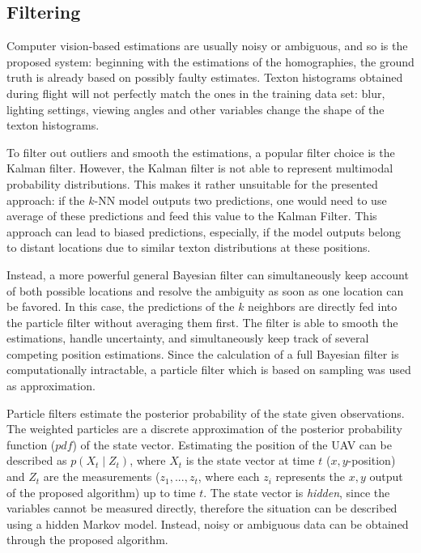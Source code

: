 \documentclass{report}
\begin{document}
\subsection{Filtering}
\label{sec:filtering}

Computer vision-based estimations are usually noisy or ambiguous, and
so is the proposed system: beginning with the estimations of the
homographies, the ground truth is already based on possibly faulty
estimates. Texton histograms obtained during flight will not perfectly
match the ones in the training data set: blur, lighting settings,
viewing angles and other variables change the shape of the texton
histograms.

To filter out outliers and smooth the estimations, a popular filter
choice is the Kalman filter. However, the Kalman filter is not able to
represent multimodal probability distributions. This makes it rather
unsuitable for the presented approach: if the $k$-NN model outputs two
predictions, one would need to use average of these predictions and
feed this value to the Kalman Filter. This approach can lead to biased
predictions, especially, if the model outputs belong to distant
locations due to similar texton distributions at these positions.

Instead, a more powerful general Bayesian filter can simultaneously
keep account of both possible locations and resolve the ambiguity as
soon as one location can be favored. In this case, the predictions of
the $k$ neighbors are directly fed into the particle filter without
averaging them first. The filter is able to smooth the estimations,
handle uncertainty, and simultaneously keep track of several competing
position estimations. Since the calculation of a full Bayesian filter
is computationally intractable, a particle filter which is based on
sampling was used as approximation.

Particle filters estimate the posterior probability of the state given
observations. The weighted particles are a discrete approximation of
the posterior probability function ($pdf$) of the state vector.
Estimating the position of the UAV can be described as
$p(X_t \mid Z_t)$, where $X_t$ is the state vector at time $t$
($x,y$-position) and $Z_t$ are the measurements ($z_1, ..., z_t$,
where each $z_i$ represents the $x,y$ output of the proposed
algorithm) up to time $t$. The state vector is \emph{hidden}, since
the variables cannot be measured directly, therefore the situation can
be described using a hidden Markov model. Instead, noisy or ambiguous
data can be obtained through the proposed algorithm.
\end{document}
